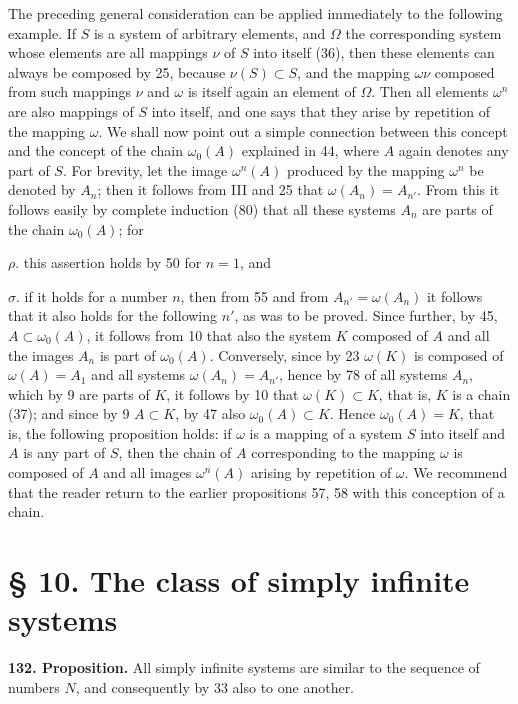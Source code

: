 \documentclass[11pt]{article}
\newcommand{\partof}{\mathrel{\subset}}
\begin{document}
The preceding general consideration can be applied immediately to the following example. If $S$ is a system of arbitrary elements, and $\Omega$ the corresponding system whose elements are all mappings $\nu$ of $S$ into itself (36), then these elements can always be composed by 25, because $\nu(S)\partof S$, and the mapping $\omega\nu$ composed from such mappings $\nu$ and $\omega$ is itself again an element of $\Omega$. Then all elements $\omega^n$ are also mappings of $S$ into itself, and one says that they arise by repetition of the mapping $\omega$. We shall now point out a simple connection between this concept and the concept of the chain $\omega_0(A)$ explained in 44, where $A$ again denotes any part of $S$. For brevity, let the image $\omega^n(A)$ produced by the mapping $\omega^n$ be denoted by $A_n$; then it follows from III and 25 that $\omega(A_n)=A_{n'}$. From this it follows easily by complete induction (80) that all these systems $A_n$ are parts of the chain $\omega_0(A)$; for

\noindent $\rho.$ this assertion holds by 50 for $n=1$, and

\noindent $\sigma.$ if it holds for a number $n$, then from 55 and from $A_{n'}=\omega(A_n)$ it follows that it also holds for the following $n'$, as was to be proved. Since further, by 45, $A\partof\omega_0(A)$, it follows from 10 that also the system $K$ composed of $A$ and all the images $A_n$ is part of $\omega_0(A)$. Conversely, since by 23 $\omega(K)$ is composed of $\omega(A)=A_1$ and all systems $\omega(A_n)=A_{n'}$, hence by 78 of all systems $A_n$, which by 9 are parts of $K$, it follows by 10 that $\omega(K)\partof K$, that is, $K$ is a chain (37); and since by 9 $A\partof K$, by 47 also $\omega_0(A)\partof K$. Hence $\omega_0(A)=K$, that is, the following proposition holds: if $\omega$ is a mapping of a system $S$ into itself and $A$ is any part of $S$, then the chain of $A$ corresponding to the mapping $\omega$ is composed of $A$ and all images $\omega^n(A)$ arising by repetition of $\omega$. We recommend that the reader return to the earlier propositions 57, 58 with this conception of a chain.

\section*{§ 10. The class of simply infinite systems}

\noindent\textbf{132. Proposition.} All simply infinite systems are similar to the sequence of numbers $N$, and consequently by 33 also to one another.
\end{document}
